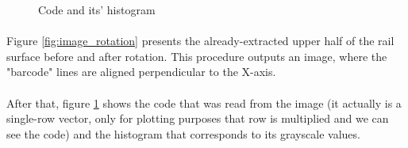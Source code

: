 \begin{figure}[H]
     \centering
     \vfill
     \caption{Code and its' histogram}
     \label{fig:code_with_histogram}
\end{figure}

\paragraph{}
Figure \ref{fig:image_rotation} presents the already-extracted upper half of the rail surface before and after rotation. This procedure outputs an image, where the "barcode" lines are aligned perpendicular to the X-axis. 

\paragraph{}
After that, figure \ref{fig:code_with_histogram} shows the code that was read from the image (it actually is a single-row vector, only for plotting purposes that row is multiplied and we can see the code) and the histogram that corresponds to its grayscale values.

